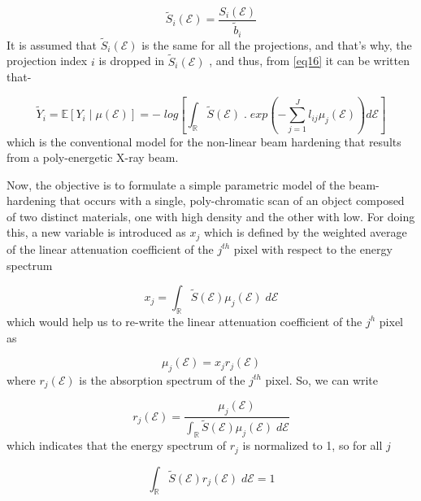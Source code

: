 \begin{equation}
\label{eq18}
\widetilde{S}_{i}(\mathcal{E}) = \frac{S_i(\mathcal{E})}{\widetilde{b}_{i}}
\end{equation} It is assumed that $\widetilde{S}_{i}(\mathcal{E})$ is the same for all the projections, and that's why, the projection index $i$ is dropped in $\widetilde{S}_{i}(\mathcal{E})$ , and thus, from \ref{eq16} it can be written that-

\begin{equation}
\label{eq19}
\widetilde{Y}_{i} = \mathbb{E} \left[ Y_i\mid\mu(\mathcal{E}) \right] =  - \; log \left[ \int_{\mathbb{R}} \widetilde{S}(\mathcal{E}) \; . \; exp \left( - \sum\limits_{j=1}^J l_{ij} \mu_j(\mathcal{E}) \right) d\mathcal{E}  \right]
\end{equation} which is the conventional model for the non-linear beam hardening that results from a poly-energetic X-ray beam.

Now, the objective is to formulate a simple parametric model of the beam-hardening that occurs with a single, poly-chromatic scan of an object composed of two distinct materials, one with high density and the other with low. For doing this, a new variable is introduced as $x_j$ which is defined by the weighted average of the linear attenuation coefficient of the $j^{th}$ pixel with respect to the energy spectrum

\begin{equation}
\label{eq20}
x_{j} = \int_{\mathbb{R}} \widetilde{S}(\mathcal{E}) \mu_j(\mathcal{E}) \; d\mathcal{E}
\end{equation} which would help us to re-write the linear attenuation coefficient of the $j^{h}$ pixel as

\begin{equation}
\label{eq21}
\mu_{j}(\mathcal{E}) = x_j r_j(\mathcal{E})
\end{equation} where $r_j(\mathcal{E})$ is the absorption spectrum of the $j^{th}$ pixel. So, we can write 

\begin{equation}
\label{eq22}
r_j(\mathcal{E})=\frac{\mu_j(\mathcal{E})}{\int_{\mathbb{R}} \widetilde{S}(\mathcal{E}) \mu_j(\mathcal{E}) \; d\mathcal{E}}
\end{equation} which indicates that the energy spectrum of $r_j$ is normalized to 1, so for all $j$ 

\begin{equation}
\label{eq23}
\int_{\mathbb{R}} \widetilde{S}(\mathcal{E}) r_j(\mathcal{E}) \; d\mathcal{E} = 1
\end{equation}


